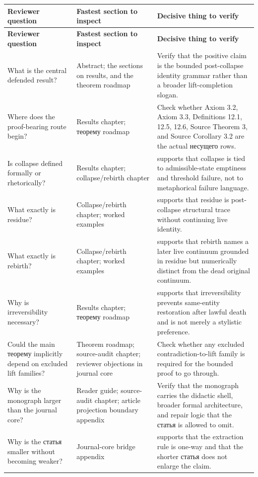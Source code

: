 \begin{longtable}{p{3.4cm} p{4.4cm} p{5.7cm}}
\toprule
\textbf{Reviewer question} & \textbf{Fastest section to inspect} & \textbf{Decisive thing to verify} \\
\midrule
\endfirsthead
\toprule
\textbf{Reviewer question} & \textbf{Fastest section to inspect} & \textbf{Decisive thing to verify} \\
\midrule
\endhead
\bottomrule
\endfoot
What is the central defended result? & Abstract; the sections on results, and the theorem roadmap & Verify that the positive claim is the bounded post-collapse identity grammar rather than a broader lift-completion slogan. \\
Where does the proof-bearing route begin? & Results chapter; теорему roadmap & Check whether Axiom 3.2, Axiom 3.3, Definitions 12.1, 12.5, 12.6, Source Theorem 3, and Source Corollary 3.2 are the actual несущего rows. \\
Is collapse defined formally or rhetorically? & Results chapter; collapse/rebirth chapter & supports that collapse is tied to admissible-state emptiness and threshold failure, not to metaphorical failure language. \\
What exactly is residue? & Collapse/rebirth chapter; worked examples & supports that residue is post-collapse structural trace without continuing live identity. \\
What exactly is rebirth? & Collapse/rebirth chapter; worked examples & supports that rebirth names a later live continuum grounded in residue but numerically distinct from the dead original continuum. \\
Why is irreversibility necessary? & Results chapter; теорему roadmap & supports that irreversibility prevents same-entity restoration after lawful death and is not merely a stylistic preference. \\
Could the main теорему implicitly depend on excluded lift families? & Theorem roadmap; source-audit chapter; reviewer objections in journal core & Check whether any excluded contradiction-to-lift family is required for the bounded proof to go through. \\
Why is the monograph larger than the journal core? & Reader guide; source-audit chapter; article projection boundary appendix & Verify that the monograph carries the didactic shell, broader formal architecture, and repair logic that the статья is allowed to omit. \\
Why is the статья smaller without becoming weaker? & Journal-core bridge appendix & supports that the extraction rule is one-way and that the shorter статья does not enlarge the claim. \\

\end{longtable}
